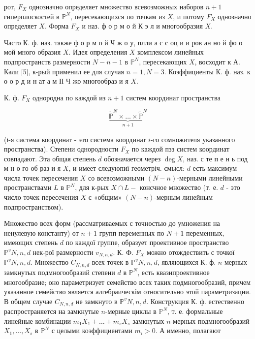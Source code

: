 \documentclass[10pt]{article}
\begin{document}
рот, $F_{X}$ однозначно определяет множество всевозможных наборов $n+1$ гиперплоскостей в $\mathbb{P}^{N}$, пересекающихся по точкам из $X$, и потому $F_{X}$ однозначно определяет $X$. Форма $F_{X}$ и наз. ф о р м о й К э л и многообразия $X$.



Часто К. ф. наз. также ф о р м о й Ч ж о у, плли а с с оц и и ров ан но й фо о мой много образия $X$. Идея определения $X$ комплексом линейных подпространств размерности $N-n-1$ в $\mathbb{P}^{N}$, пересекающих $X$, восходит к А. Кәли [5], к-рый применил ее для случая $n=1, N=3$. Коэффициенты К. ф. наз. к о о р д и н ат а м ІІ Ч жо многообраз и я $X$.



К. ф. $F_{X}$ однородна по каждой из $n+1$ систем координат пространства



\[

\underbrace{\tilde{\mathbb{P}}^{N} \times \ldots \times \tilde{\mathbb{P}}^{N}}_{n+1}

\]



(i-я система координат - это система координат $i$-го сомножителя указанного пространства). Степени однородности $F_{X}$ по каждой пзз систем координат совпадают. Эта общая степень $d$ обозначается через $\operatorname{deg} X$, наз. с те п е н ь под м н о го об раз и я $X$, и имеет следуюпиї геометріч. смысл: $d$ есть максимум числа точек пересечения $X$ со всевозможными $(N-n)$-мерными линейными пространствами $L$ в $\mathbb{P}^{N}$, для к-рых $X \cap L-$ консчное множество (т. е. $d$ - это число точек пересечения $X$ с «общим» $(N-n)$-мерным линейным подпространством).



Множество всех форм (рассматриваемых с точностью до умножения на ненулевую константу) от $n+1$ групп переменных по $N+1$ переменных, имеющих степень $d$ по каждої группе, образует проективное пространство $\mathbb{P}^{v} N, n, d$ нек-рої размерности $v_{N, n, d}$. К. Ф. $F_{X}$ можно отождествить с точкої $\mathbb{P}^{v} N, n, d$. Множество $C_{N, n, d}$ всех точек в $\mathbb{P}^{v} N, n, d$, являющихся К. ф. $n$-мерных замкнутых подмногообразий степени $d$ в $\mathbb{P}^{N}$, есть квазипроективное многообразие; оно параметризует семейство всех таких подмногообразий, причем указанное семейство является алгебраическім относительно этой параметризации. В общем случае $C_{N, n, d}$ не замкнуто в $\mathbb{P}^{v} N, n, d$. Конструкция К. ф. естественно распространяется на замкнутые $n$-мерные циклы в $\mathbb{P}^{N}$, т. е. формальные линейные комбинации $m_{1} X_{1}+\ldots+m_{s} X_{s}$ замкнутых $n$-мерных подмногообразий $X_{1}, \ldots, X_{s}$ в $\mathbb{P}^{N}$ с целыми коэффициентами $m_{i}>0$. А именно, полагают
\end{document}
